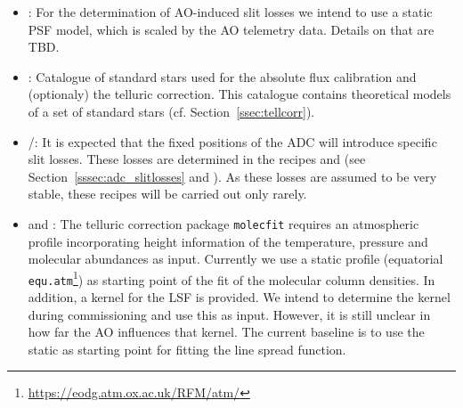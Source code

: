 \begin{itemize}
    \item \hyperref[dataitem:ao_psf_model]{}: For the determination of \ac{AO}-induced slit losses we intend to use a static \ac{PSF} model, which is scaled by the \ac{AO} telemetry data. Details on that are TBD.
    \item \hyperref[dataitem:ref_std_cat]{}: Catalogue of standard stars used for the absolute flux calibration and (optionaly) the telluric correction. This catalogue contains theoretical models of a set of standard stars (cf. Section~\ref{ssec:tellcorr}). 
    \item \hyperref[dataitem:lm_adc_slitloss]{}/\hyperref[dataitem:n_adc_slitloss]{}: It is expected that the fixed positions of the \ac{ADC} will introduce specific slit losses. These losses are determined in the recipes \hyperref[rec:metis_lm_adc_slitloss]{} and \hyperref[rec:metis_n_adc_slitloss]{} (see Section~\ref{sssec:adc_slitlosses} and \cite{METIS-calibration_plan}). As these losses are assumed to be very stable, these recipes will be carried out only rarely.
    \item \hyperref[dataitem:atm_profile]{} and \hyperref[dataitem:lsf_kernel]{}: The telluric correction package \texttt{molecfit} requires an atmospheric profile incorporating height information of the temperature, pressure and molecular abundances as input. Currently we use a static profile (equatorial \texttt{equ.atm}\footnote{\url{https://eodg.atm.ox.ac.uk/RFM/atm/}}) as starting point of the fit of the molecular column densities. In addition, a kernel for the \ac{LSF} is provided. We intend to determine the kernel during commissioning and use this as input. However, it is still unclear in how far the \ac{AO} influences that kernel. The current baseline is to use the static \hyperref[dataitem:lsf_kernel]{} as starting point for fitting the line spread function.

\end{itemize}
